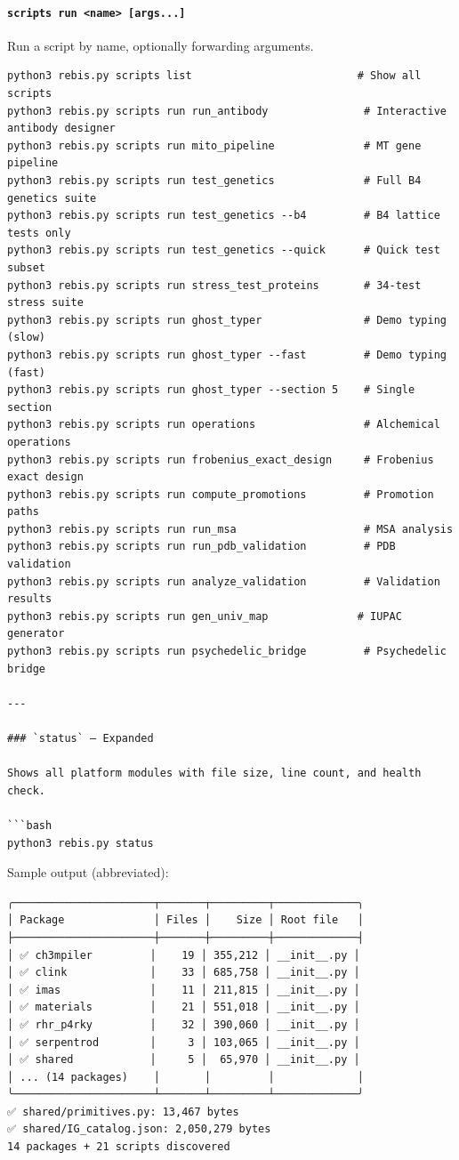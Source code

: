 \documentclass[12pt,a4paper]{article}
\begin{document}
\hypertarget{scripts-run-name-args...}{%
\paragraph{\texorpdfstring{\texttt{scripts\ run\ \textless{}name\textgreater{}\ {[}args...{]}}}{scripts run \textless name\textgreater{} {[}args...{]}}}\label{scripts-run-name-args...}}

Run a script by name, optionally forwarding arguments.

\begin{verbatim}
python3 rebis.py scripts list                          # Show all scripts
python3 rebis.py scripts run run_antibody               # Interactive antibody designer
python3 rebis.py scripts run mito_pipeline              # MT gene pipeline
python3 rebis.py scripts run test_genetics              # Full B4 genetics suite
python3 rebis.py scripts run test_genetics --b4         # B4 lattice tests only
python3 rebis.py scripts run test_genetics --quick      # Quick test subset
python3 rebis.py scripts run stress_test_proteins       # 34-test stress suite
python3 rebis.py scripts run ghost_typer                # Demo typing (slow)
python3 rebis.py scripts run ghost_typer --fast         # Demo typing (fast)
python3 rebis.py scripts run ghost_typer --section 5    # Single section
python3 rebis.py scripts run operations                 # Alchemical operations
python3 rebis.py scripts run frobenius_exact_design     # Frobenius exact design
python3 rebis.py scripts run compute_promotions         # Promotion paths
python3 rebis.py scripts run run_msa                    # MSA analysis
python3 rebis.py scripts run run_pdb_validation         # PDB validation
python3 rebis.py scripts run analyze_validation         # Validation results
python3 rebis.py scripts run gen_univ_map              # IUPAC generator
python3 rebis.py scripts run psychedelic_bridge         # Psychedelic bridge

---

### `status` — Expanded

Shows all platform modules with file size, line count, and health check.

```bash
python3 rebis.py status
\end{verbatim}

Sample output (abbreviated):

\begin{verbatim}
╭──────────────────────┬───────┬─────────┬─────────────╮
│ Package              │ Files │    Size │ Root file   │
├──────────────────────┼───────┼─────────┼─────────────┤
│ ✅ ch3mpiler         │    19 │ 355,212 │ __init__.py │
│ ✅ clink             │    33 │ 685,758 │ __init__.py │
│ ✅ imas              │    11 │ 211,815 │ __init__.py │
│ ✅ materials         │    21 │ 551,018 │ __init__.py │
│ ✅ rhr_p4rky         │    32 │ 390,060 │ __init__.py │
│ ✅ serpentrod        │     3 │ 103,065 │ __init__.py │
│ ✅ shared            │     5 │  65,970 │ __init__.py │
│ ... (14 packages)    │       │         │             │
╰──────────────────────┴───────┴─────────┴─────────────╯
✅ shared/primitives.py: 13,467 bytes
✅ shared/IG_catalog.json: 2,050,279 bytes
14 packages + 21 scripts discovered
\end{verbatim}
\end{document}
